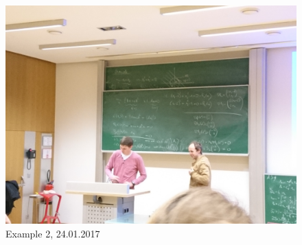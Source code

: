 \documentclass{article}
\begin{document}
\begin{figure}[H]
  \includegraphics[width=\textwidth]{2017_01_24-ex2.jpg}
  \caption{Example 2,  24.01.2017\label{fig:ex2}}
\end{figure}
\end{document}
